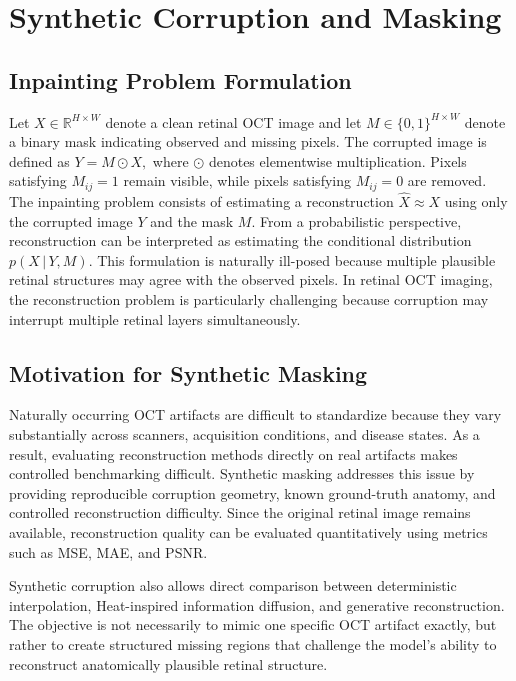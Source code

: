 \documentclass[12pt,oneside]{article}
\newcommand{\R}{\mathbb{R}}
\newcommand{\given}{\,|\,}
\begin{document}
\section{Synthetic Corruption and Masking}

\subsection*{Inpainting Problem Formulation}

Let \(X \in \R^{H \times W}\) denote a clean retinal OCT image and let \(M \in \{0,1\}^{H \times W}\) denote a binary mask indicating observed and missing pixels. The corrupted image is defined as
\(
Y = M \odot X,
\)
where $\odot$ denotes elementwise multiplication.
Pixels satisfying
\(
M_{ij}=1
\)
remain visible, while pixels satisfying
\(
M_{ij}=0
\)
are removed. The inpainting problem consists of estimating a reconstruction
\(
\hat{X}
\approx
X
\)
using only the corrupted image $Y$ and the mask $M$.
From a probabilistic perspective, reconstruction can be interpreted as estimating the conditional distribution
\(
p(X \given Y,M).
\)
This formulation is naturally ill-posed because multiple plausible retinal structures may agree with the observed pixels. In retinal OCT imaging, the reconstruction problem is particularly challenging because corruption may interrupt multiple retinal layers simultaneously.

\subsection*{Motivation for Synthetic Masking}

Naturally occurring OCT artifacts are difficult to standardize because they vary substantially across scanners, acquisition conditions, and disease states. As a result, evaluating reconstruction methods directly on real artifacts makes controlled benchmarking difficult.
Synthetic masking addresses this issue by providing reproducible corruption geometry, known ground-truth anatomy, and controlled reconstruction difficulty.
Since the original retinal image remains available, reconstruction quality can be evaluated quantitatively using metrics such as MSE, MAE, and PSNR.

Synthetic corruption also allows direct comparison between deterministic interpolation, Heat-inspired information diffusion, and generative reconstruction.
The objective is not necessarily to mimic one specific OCT artifact exactly, but rather to create structured missing regions that challenge the model's ability to reconstruct anatomically plausible retinal structure.
\end{document}
